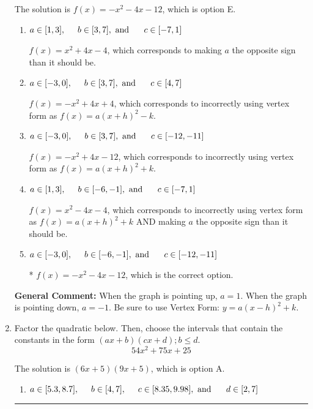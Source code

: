 \documentclass{extbook}[14pt]
\newcommand{\litem}[1]{\item #1

\rule{\textwidth}{0.4pt}}
\begin{document}
\begin{enumerate}
{The solution is \( f(x) = -x^{2} -4 x -12 \), which is option E.\begin{enumerate}[label=\Alph*.]
\item \( a \in [1, 3], \hspace*{5mm} b \in [3, 7], \text{ and } \hspace*{5mm} c \in [-7, 1] \)

$f(x)=x^{2} +4 x -4$, which corresponds to making $a$ the opposite sign than it should be.
\item \( a \in [-3, 0], \hspace*{5mm} b \in [3, 7], \text{ and } \hspace*{5mm} c \in [4, 7] \)

$f(x)=-x^{2} +4 x + 4$, which corresponds to incorrectly using vertex form as $f(x) = a(x+h)^2 - k$.
\item \( a \in [-3, 0], \hspace*{5mm} b \in [3, 7], \text{ and } \hspace*{5mm} c \in [-12, -11] \)

$f(x)=-x^{2} +4 x -12$, which corresponds to incorrectly using vertex form as $f(x) = a(x+h)^2+k$.
\item \( a \in [1, 3], \hspace*{5mm} b \in [-6, -1], \text{ and } \hspace*{5mm} c \in [-7, 1] \)

$f(x)=x^{2} -4 x -4$, which corresponds to incorrectly using vertex form as $f(x) = a(x+h)^2+k$ AND making $a$ the opposite sign than it should be.
\item \( a \in [-3, 0], \hspace*{5mm} b \in [-6, -1], \text{ and } \hspace*{5mm} c \in [-12, -11] \)

* $f(x)=-x^{2} -4 x -12$, which is the correct option.
\end{enumerate}

\textbf{General Comment:} When the graph is pointing up, $a=1$. When the graph is pointing down, $a=-1$. Be sure to use Vertex Form: $y = a(x-h)^2+k$.
}
\litem{
Factor the quadratic below. Then, choose the intervals that contain the constants in the form $(ax+b)(cx+d); b \leq d.$
\[ 54x^{2} +75 x + 25 \]

The solution is \( (6x + 5)(9x + 5) \), which is option A.\begin{enumerate}[label=\Alph*.]
\item \( a \in [5.3, 8.7], \hspace*{5mm} b \in [4, 7], \hspace*{5mm} c \in [8.35, 9.98], \text{ and } \hspace*{5mm} d \in [2, 7] \)


\end{enumerate}}
\end{enumerate}
\end{document}
